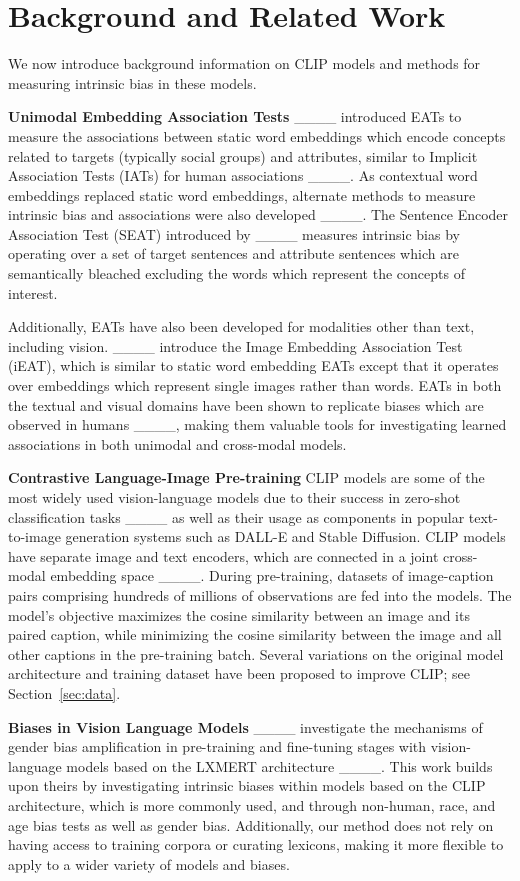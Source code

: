 \section{Background and Related Work}
\label{sec:rw}
We now introduce background information on CLIP models and methods for measuring intrinsic bias in these models.

\noindent\textbf{Unimodal Embedding Association Tests}
____ introduced EATs to measure the associations between static word embeddings which encode concepts related to targets (typically social groups) and attributes, similar to Implicit Association Tests (IATs) for human associations ____. As contextual word embeddings replaced static word embeddings, alternate methods to measure intrinsic bias and associations were also developed ____. The Sentence Encoder Association Test (SEAT) introduced by ____ measures intrinsic bias by operating over a set of  target sentences and attribute sentences which are semantically bleached excluding the words which represent the concepts of interest.  

Additionally, EATs have also been developed for modalities other than text, including vision. ____ introduce the Image Embedding Association Test (iEAT), which is similar to static word embedding EATs except that it operates over embeddings which represent single images rather than words. EATs in both the textual and visual domains have been shown to replicate biases which are observed in humans ____, making them valuable tools for investigating learned associations in both unimodal and cross-modal models. 

\noindent\textbf{Contrastive Language-Image Pre-training} 
CLIP models are some of the most widely used vision-language models due to their success in zero-shot classification tasks ____ as well as their usage as components in popular text-to-image generation systems such as DALL-E and Stable Diffusion. CLIP models have separate image and text encoders, which are connected in a joint cross-modal embedding space ____.  During pre-training, datasets of image-caption pairs comprising hundreds of millions of observations are fed into the models. The model's objective maximizes the cosine similarity between an image and its paired caption, while minimizing the cosine similarity between the image and all other captions in the pre-training batch. Several variations on the original model architecture and training dataset have been proposed to improve CLIP; see Section~\ref{sec:data}.


\noindent\textbf{Biases in Vision Language Models}
____ investigate the mechanisms of gender bias amplification in pre-training and fine-tuning stages with vision-language models based on the LXMERT architecture ____. This work builds upon theirs by investigating intrinsic biases within models based on the CLIP architecture, which is more commonly used, and through non-human, race, and age bias tests as well as gender bias. Additionally, our method does not rely on having access to training corpora or curating lexicons, making it more flexible to apply to a wider variety of models and biases.

